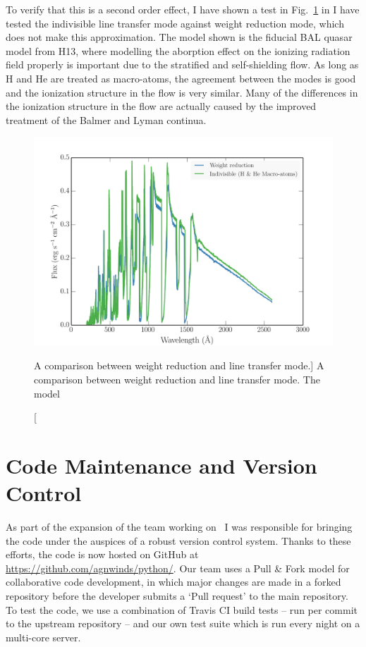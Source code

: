 To verify that this is a second order effect, 
I have shown a test in Fig.~\ref{fig:line_transfer} in I have tested the indivisible
line transfer mode against weight reduction mode, which does not make this 
approximation. The model shown is the fiducial BAL quasar model from
H13, where modelling the aborption effect on the ionizing radiation field 
properly is important due to the stratified
and self-shielding flow. As long as H and He are treated as macro-atoms, the agreement
between the modes is good and the ionization structure in the flow is very similar.
Many of the differences in the ionization structure in the flow are actually
caused by the improved treatment of the Balmer and Lyman continua.

\begin{figure}
\centering
\includegraphics[width=1.0\textwidth]{figures/03-radtrans/line_transfer_comparison.png}
\caption
[A comparison between weight reduction and line transfer mode.]
{
A comparison between weight reduction and line transfer mode. 
The model
} 
\label{fig:line_transfer}
\end{figure}

\section{Code Maintenance and Version Control}
\label{sec:code_maintenance}

As part of the expansion of the team working on \py\, I was responsible
for bringing the code under the auspices of a robust version control system.
Thanks to these efforts, the code is now hosted on GitHub at 
\url{https://github.com/agnwinds/python/}. Our team uses a Pull \& Fork model
for collaborative code development, in which major changes are made in a 
forked repository before the developer submits a `Pull request' to the main 
repository. To test the code, we use a combination of Travis CI build tests 
-- run per commit to the upstream repository -- and our own test suite which is 
run every night on a multi-core server. 

